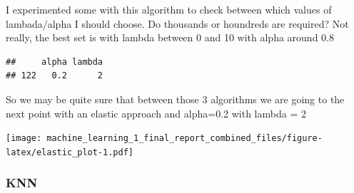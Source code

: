 \documentclass[
]{article}
\newenvironment{Shaded}{\begin{snugshade}}{\end{snugshade}}
\newcommand{\CommentTok}[1]{\textcolor[rgb]{0.56,0.35,0.01}{\textit{#1}}}
\newcommand{\DataTypeTok}[1]{\textcolor[rgb]{0.13,0.29,0.53}{#1}}
\newcommand{\DecValTok}[1]{\textcolor[rgb]{0.00,0.00,0.81}{#1}}
\newcommand{\FloatTok}[1]{\textcolor[rgb]{0.00,0.00,0.81}{#1}}
\newcommand{\KeywordTok}[1]{\textcolor[rgb]{0.13,0.29,0.53}{\textbf{#1}}}
\newcommand{\NormalTok}[1]{#1}
\newcommand{\OperatorTok}[1]{\textcolor[rgb]{0.81,0.36,0.00}{\textbf{#1}}}
\newcommand{\StringTok}[1]{\textcolor[rgb]{0.31,0.60,0.02}{#1}}
\begin{document}
I experimented some with this algorithm to check between which values of
lambada/alpha I should choose. Do thousands or houndreds are required?
Not really, the best set is with lambda between 0 and 10 with alpha
around 0.8

\begin{Shaded}
\end{Shaded}

\begin{verbatim}
##     alpha lambda
## 122   0.2      2
\end{verbatim}

So we may be quite sure that between those 3 algorithms we are going to
the next point with an elastic approach and alpha=0.2 with lambda = 2

\texttt{[image: machine\_learning\_1\_final\_report\_combined\_files/figure-latex/elastic\_plot-1.pdf]}

\hypertarget{knn}{%
\subsubsection{KNN}\label{knn}}
\end{document}
